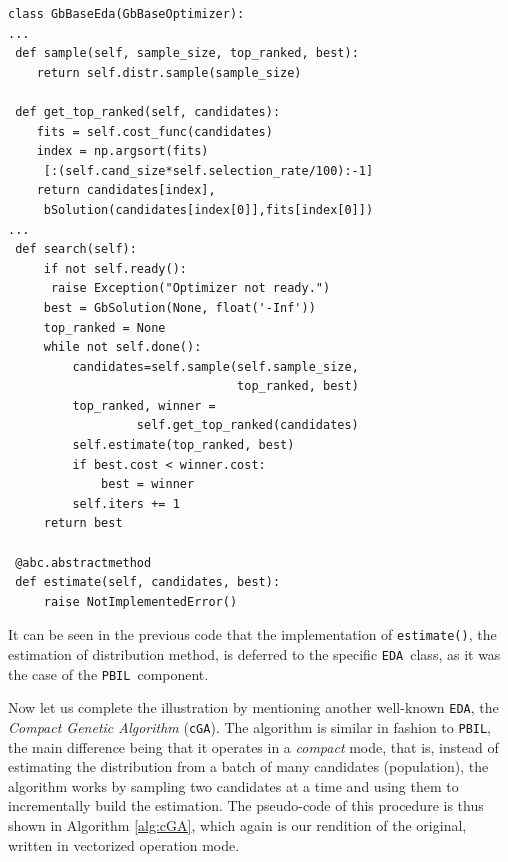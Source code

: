 \documentclass{sig-alternate}
\newcommand{\PBIL}{\texttt{PBIL}}
\newcommand{\cGA}{\texttt{cGA}}
\newcommand{\EDA}{\texttt{EDA}}
\begin{document}

\begin{verbatim}
class GbBaseEda(GbBaseOptimizer):
...
 def sample(self, sample_size, top_ranked, best):
    return self.distr.sample(sample_size)

 def get_top_ranked(self, candidates):
    fits = self.cost_func(candidates)
    index = np.argsort(fits)
     [:(self.cand_size*self.selection_rate/100):-1]
    return candidates[index], 
     bSolution(candidates[index[0]],fits[index[0]])
... 
 def search(self):
     if not self.ready():
      raise Exception("Optimizer not ready.")
     best = GbSolution(None, float('-Inf'))
     top_ranked = None
     while not self.done():
         candidates=self.sample(self.sample_size, 
                                top_ranked, best)
         top_ranked, winner = 
                  self.get_top_ranked(candidates)
         self.estimate(top_ranked, best)          
         if best.cost < winner.cost:
             best = winner
         self.iters += 1
     return best

 @abc.abstractmethod
 def estimate(self, candidates, best):
     raise NotImplementedError()
\end{verbatim}

It can be seen in the previous code that the implementation of \texttt{estimate()}, the estimation of distribution method, is deferred to the specific \EDA~class, as it was the case of the \PBIL~component. 

Now let us complete the illustration by mentioning another well-known \EDA, the \textit{Compact Genetic Algorithm} (\cGA)\cite{Harik99}. The algorithm is similar in fashion to \PBIL, the main difference being that it operates in a \textit{compact} mode, that is, instead of estimating the distribution from a batch of many candidates (population), the algorithm works by sampling two candidates at a time and using them to incrementally build the estimation. The pseudo-code of this procedure is thus shown in Algorithm \ref{alg:cGA}, which again is our rendition of the original, written in vectorized operation mode.
\end{document}
